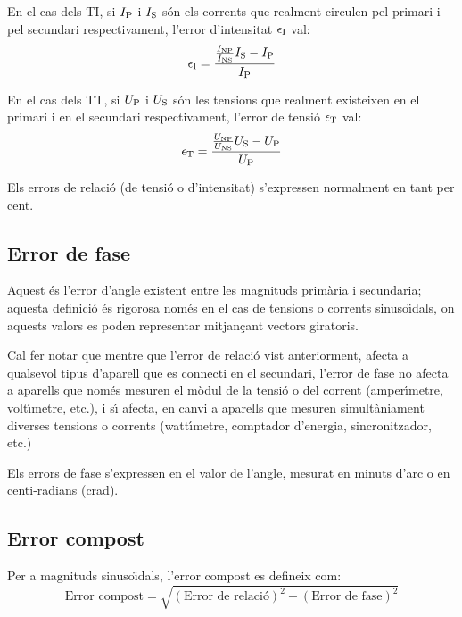 En el cas dels TI, si $I_\mathrm{P}$ i $I_\mathrm{S}$ s\'{o}n els corrents que
realment circulen pel primari i pel secundari respectivament,
l'error d'intensitat $\epsilon_\mathrm{I}$ val:
\begin{equation}
    \epsilon_\mathrm{I} = \frac{\frac{I_\mathrm{NP}}{I_\mathrm{NS}} I_\mathrm{S} - I_\mathrm{P}} {I_\mathrm{P}}
\end{equation}

En el cas dels TT, si $U_\mathrm{P}$ i $U_\mathrm{S}$ s\'{o}n les tensions que
realment existeixen en el primari i en el secundari respectivament,
l'error de tensi\'{o} $\epsilon_\mathrm{T}$ val:
\begin{equation}
    \epsilon_\mathrm{T} = \frac{\frac{U_\mathrm{NP}}{U_\mathrm{NS}} U_\mathrm{S} - U_\mathrm{P}} {U_\mathrm{P}}
\end{equation}

Els errors de relaci\'{o} (de tensi\'{o} o d'intensitat) s'expressen
normalment en tant per cent.

\subsection{Error de fase}

Aquest \'{e}s l'error d'angle  existent entre les magnituds prim\`{a}ria i
secundaria; aquesta definici\'{o} \'{e}s rigorosa nom\'{e}s en el cas de
tensions o corrents sinuso\"{\i}dals, on aquests valors es poden
representar mitjan\c{c}ant vectors giratoris.

 Cal fer notar que mentre que l'error de relaci\'{o}
vist anteriorment, afecta a qualsevol tipus d'aparell que es
connecti en el secundari, l'error de fase no afecta a aparells que
nom\'{e}s mesuren el m\`{o}dul de la tensi\'{o} o del corrent (amper\'{\i}metre,
volt\'{\i}metre, etc.), i s\'{\i} afecta, en canvi a aparells que mesuren
simult\`{a}niament diverses tensions o corrents (watt\'{\i}metre, comptador
d'energia, sincronitzador, etc.)

Els errors de fase s'expressen en el valor de l'angle, mesurat en
minuts d'arc o en centi-radians (crad).

\subsection{Error compost}

Per a magnituds sinuso\"{\i}dals, l'error compost es defineix com:
\begin{equation}
    \text{Error compost} = \sqrt{(\text{Error de relaci\'{o}})^2 +
    (\text{Error de fase})^2}
\end{equation}

